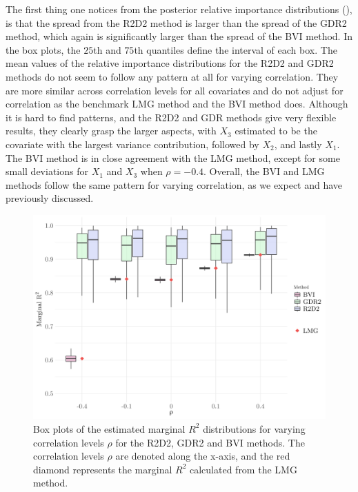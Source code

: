\noindent The first thing one notices from the posterior relative importance distributions (), is that the spread from the R2D2 method is larger than the spread of the GDR2 method, which again is significantly larger than the spread of the BVI method. In the box plots, the $25$th and $75$th quantiles define the interval of each box. The mean values of the relative importance distributions for the R2D2 and GDR2 methods do not seem to follow any pattern at all for varying correlation. They are more similar across correlation levels for all covariates and do not adjust for correlation as the benchmark LMG method and the BVI method does. Although it is hard to find patterns, and the R2D2 and GDR methods give very flexible results, they clearly grasp the larger aspects, with $X_3$ estimated to be the covariate with the largest variance contribution, followed by $X_2$, and lastly $X_1$. The BVI method is in close agreement with the LMG method, except for some small deviations for $X_1$ and $X_3$ when $\rho=-0.4$. Overall, the BVI and LMG methods follow the same pattern for varying correlation, as we expect and have previously discussed.
\begin{figure}[H]%
  \centering
  \includegraphics[width=1\linewidth]{Figures/R2D2_BVI_Comparison/R2D2_BVI_R2_plot.png}
  \caption[Comparison of the marginal $R^2$ from the BVI method and the shrinkage prior methods]{Box plots of the estimated marginal $R^2$ distributions for varying correlation levels $\rho$ for the R2D2, GDR2 and BVI methods. The correlation levels $\rho$ are denoted along the x-axis, and the red diamond represents the marginal $R^2$ calculated from the LMG method.}
  \label{fig:r2d2_r2}
\end{figure}
